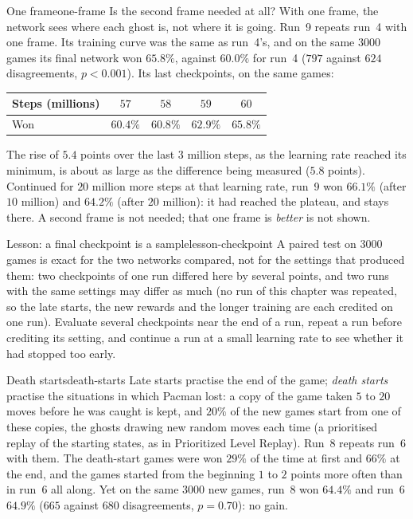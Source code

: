 \begin{pacman}{One frame}{one-frame}
  Is the second frame needed at all? With one frame, the network sees where
  each ghost is, not where it is going. Run~9 repeats run~4 with one frame.
  Its training curve was the same as run~4's, and on the same $3000$ games
  its final network won $65.8\%$, against $60.0\%$ for run~4 ($797$ against
  $624$ disagreements, $p < 0.001$). Its last checkpoints, on the same games:
  \begin{center}
    \begin{tabular}{@{}lcccc@{}}
      \toprule
      Steps (millions) & $57$ & $58$ & $59$ & $60$ \\
      \midrule
      Won & $60.4\%$ & $60.8\%$ & $62.9\%$ & $65.8\%$ \\
      \bottomrule
    \end{tabular}
  \end{center}
  The rise of $5.4$ points over the last $3$ million steps, as the learning
  rate reached its minimum, is about as large as the difference being
  measured ($5.8$ points).
  Continued for $20$ million more steps at that learning rate, run~9 won
  $66.1\%$ (after $10$ million) and $64.2\%$ (after $20$ million): it had
  reached the plateau, and stays there. A second frame is not needed; that
  one frame is \emph{better} is not shown.
\end{pacman}

\begin{remark}{Lesson: a final checkpoint is a sample}{lesson-checkpoint}
  A paired test on $3000$ games is exact for the two networks compared, not
  for the settings that produced them: two checkpoints of one run differed
  here by several points, and two runs with the same settings may differ
  as much (no run of this chapter was repeated, so the late starts, the
  new rewards and the longer training are each credited on one run). Evaluate
  several checkpoints near the end of a run, repeat a run before crediting its
  setting, and continue a run at a small learning rate to see whether it had
  stopped too early.
\end{remark}

\begin{pacman}{Death starts}{death-starts}
  Late starts practise the end of the game; \emph{death starts} practise the
  situations in which Pacman lost: a copy of the game taken $5$ to $20$ moves
  before he was caught is kept, and $20\%$ of the new games start from one of
  these copies, the ghosts drawing new random moves each time (a prioritised
  replay of the starting states, as in Prioritized Level Replay). Run~8
  repeats run~6 with them. The death-start games were won $29\%$ of the time
  at first and $66\%$ at the end, and the games started from the beginning
  $1$ to $2$ points more often than in run~6 all along. Yet on the same
  $3000$ new games, run~8 won $64.4\%$ and run~6 $64.9\%$ ($665$ against
  $680$ disagreements, $p = 0.70$): no gain.
\end{pacman}

